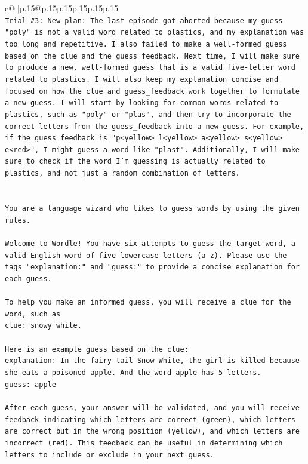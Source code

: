 \documentclass{article}
\begin{document}
{\begin{supertabular}{c@{$\;$}|p{.15\linewidth}@{}p{.15\linewidth}p{.15\linewidth}p{.15\linewidth}p{.15\linewidth}p{.15\linewidth}}
{{{\\ 
\texttt{Trial \#3: New plan: The last episode got aborted because my guess "poly" is not a valid word related to plastics, and my explanation was too long and repetitive. I also failed to make a well{-}formed guess based on the clue and the guess\_feedback. Next time, I will make sure to produce a new, well{-}formed guess that is a valid five{-}letter word related to plastics. I will also keep my explanation concise and focused on how the clue and guess\_feedback work together to formulate a new guess. I will start by looking for common words related to plastics, such as "poly" or "plas", and then try to incorporate the correct letters from the guess\_feedback into a new guess. For example, if the guess\_feedback is "p<yellow> l<yellow> a<yellow> s<yellow> e<red>", I might guess a word like "plast". Additionally, I will make sure to check if the word I'm guessing is actually related to plastics, and not just a random combination of letters.} \\
\\ 
\\ 
\texttt{You are a language wizard who likes to guess words by using the given rules.} \\
\\ 
\texttt{Welcome to Wordle! You have six attempts to guess the target word, a valid English word of five lowercase letters (a{-}z). Please use the tags "explanation:" and "guess:" to provide a concise explanation for each guess.} \\
\\ 
\texttt{To help you make an informed guess, you will receive a clue for the word, such as} \\
\texttt{clue: snowy white.} \\
\\ 
\texttt{Here is an example guess based on the clue:} \\
\texttt{explanation: In the fairy tail Snow White, the girl is killed because she eats a poisoned apple. And the word apple has 5 letters.} \\
\texttt{guess: apple} \\
\\ 
\texttt{After each guess, your answer will be validated, and you will receive feedback indicating which letters are correct (green), which letters are correct but in the wrong position (yellow), and which letters are incorrect (red). This feedback can be useful in determining which letters to include or exclude in your next guess.} \\
}}}
\end{supertabular}}
\end{document}
